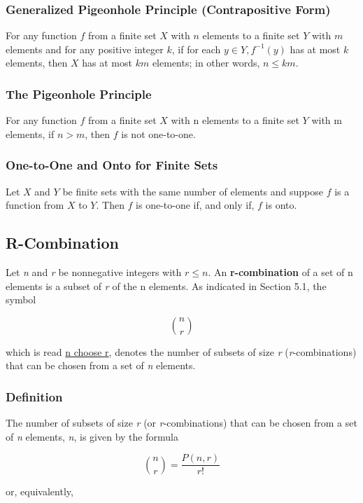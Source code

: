 \documentclass{article}
\begin{document}
\subsubsection{Generalized Pigeonhole Principle (Contrapositive Form)}
For any function $f$ from a finite set $X$ with $n$ elements to a finite set $Y$ with $m$ elements and for any positive integer $k$, if for each $y \in Y, f ^{−1} (y)$ has at most $k$ elements, then $X$ has at most $km$ elements; in other words, $n \leq km$.

\subsubsection{The Pigeonhole Principle}
For any function $f$ from a finite set $X$ with n elements to a finite set $Y$ with m elements, if $n > m$, then $f$ is not one-to-one.

\subsubsection{One-to-One and Onto for Finite Sets}
Let $X$ and $Y$ be finite sets with the same number of elements and suppose $f$ is a function from $X$ to $Y$. Then $f$ is one-to-one if, and only if, $f$ is onto.


\setcounter{section}{9}
\setcounter{subsection}{4}

\subsection{R-Combination}
Let \textit{n} and \textit{r} be nonnegative integers with $r \leq n$. An \textbf{r-combination} of a set of n elements is a subset of \textit{r} of the n elements. As indicated in Section 5.1, the symbol

\[
{{n}\choose{r}}
\]

which is read \underline{n choose r}, denotes the number of subsets of size \textit{r} (\textit{r}-combinations) that can be chosen from a set of \textit{n} elements.

\subsubsection{Definition}
The number of subsets of size \textit{r} (or \textit{r}-combinations) that can be chosen from a set of \textit{n} elements,  \textit{n}, is given by the formula

\[
{{n}\choose{r}}
 = \frac{P(n, r)}{r!}\]

or, equivalently,
\end{document}
